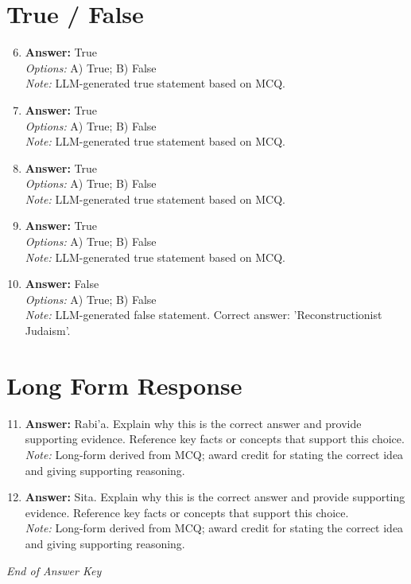 \documentclass[12pt]{article}
\begin{document}
\section*{True / False}
\begin{enumerate}[label=\arabic*.]
\setcounter{enumi}{5}
\item \textbf{Answer:} True
\\ \textit{Options:} A) True; B) False
\\ \textit{Note:} LLM-generated true statement based on MCQ.
\item \textbf{Answer:} True
\\ \textit{Options:} A) True; B) False
\\ \textit{Note:} LLM-generated true statement based on MCQ.
\item \textbf{Answer:} True
\\ \textit{Options:} A) True; B) False
\\ \textit{Note:} LLM-generated true statement based on MCQ.
\item \textbf{Answer:} True
\\ \textit{Options:} A) True; B) False
\\ \textit{Note:} LLM-generated true statement based on MCQ.
\item \textbf{Answer:} False
\\ \textit{Options:} A) True; B) False
\\ \textit{Note:} LLM-generated false statement. Correct answer: 'Reconstructionist Judaism'.
\end{enumerate}

\section*{Long Form Response}
\begin{enumerate}[label=\arabic*.]
\setcounter{enumi}{10}
\item \textbf{Answer:} Rabi'a. Explain why this is the correct answer and provide supporting evidence. Reference key facts or concepts that support this choice.
\\ \textit{Note:} Long-form derived from MCQ; award credit for stating the correct idea and giving supporting reasoning.
\item \textbf{Answer:} Sita. Explain why this is the correct answer and provide supporting evidence. Reference key facts or concepts that support this choice.
\\ \textit{Note:} Long-form derived from MCQ; award credit for stating the correct idea and giving supporting reasoning.
\end{enumerate}

\vfill
\noindent\textit{End of Answer Key}
\end{document}
